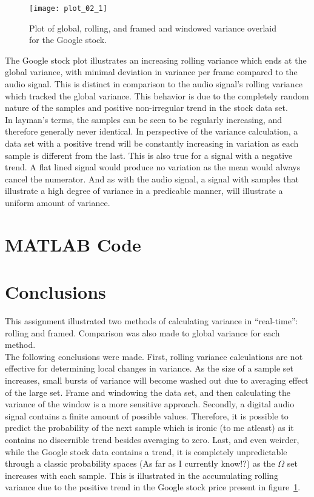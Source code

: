  \begin{figure}[h] 
 	\centering 
 	\texttt{[image: plot\_02\_1]}
 	\caption{Plot of global, rolling, and framed and windowed variance overlaid for the Google stock.}
 	\label{fig: google} 
 \end{figure}
 
 The Google stock plot illustrates an increasing rolling variance which ends at the global variance, with minimal deviation in variance per frame compared to the audio signal. 
 This is distinct in comparison to the audio signal's rolling variance which tracked the global variance. This behavior is due to the completely random nature of the samples and positive non-irregular trend in the stock data set. \\
 
 In layman's terms, the samples can be seen to be regularly increasing, and therefore generally never identical. In perspective of the variance calculation, a data set with a positive trend will be constantly increasing in variation as each sample is different from the last. This is also true for a signal with a negative trend. A flat lined signal would produce no variation as the mean would always cancel the numerator. And as with the audio signal, a signal with samples that illustrate a high degree of variance in a predicable manner, will illustrate a uniform amount of variance.   
 
 
\section{MATLAB Code} 


\section{Conclusions} 
This assignment illustrated two methods of calculating variance in ``real-time'': rolling and framed. Comparison was also made to global variance for each method. \\

The following conclusions were made. First, rolling variance calculations are not effective for determining local changes in variance. As the size of a sample set increases, small bursts of variance will become washed out due to averaging effect of the large set. Frame and windowing the data set, and then calculating the variance of the window is a more sensitive approach. Secondly, a digital audio signal contains a finite amount of possible values. Therefore, it is possible to predict the probability of the next sample which is ironic (to me atleast) as it contains no discernible trend besides averaging to zero. Last, and even weirder, while the Google stock data contains a trend, it is completely unpredictable through a classic probability spaces (As far as I currently know!?) as the $\Omega$ set increases with each sample. This is illustrated in the accumulating rolling variance due to the positive trend in the Google stock price present in figure~\ref{fig: google}. 

